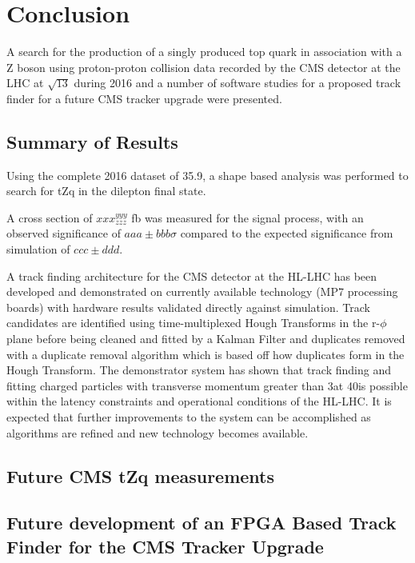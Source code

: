 \chapter{Conclusion}\label{chapter:conclusion}

A search for the production of a singly produced top quark in association with a Z boson using proton-proton collision data recorded by the CMS detector at the LHC at $\sqrt{13}$ during 2016 and a number of software studies for a proposed track finder for a future CMS tracker upgrade were presented.

\section{Summary of Results}
Using the complete 2016 dataset of 35.9\fbinv, a shape based analysis was performed to search for tZq in the dilepton final state.

A cross section of $xxx^{yyy}_{zzz}$ fb was measured for the signal process, with an observed significance of $aaa \pm bbb \sigma$ compared to the expected significance from simulation of $ccc \pm ddd$. 

A track finding architecture for the CMS detector at the HL-LHC has been developed and demonstrated on currently available technology (MP7 processing boards) with hardware results validated directly against simulation. Track candidates are identified using time-multiplexed Hough Transforms in the r-$\phi$ plane before being cleaned and fitted by a Kalman Filter and duplicates removed with a duplicate removal algorithm which is based off how duplicates form in the Hough Transform. The demonstrator system has shown that track finding and fitting charged particles with transverse momentum greater than 3\GeV at 40\MHz is possible within the latency constraints and operational conditions of the HL-LHC. It is expected that further improvements to the system can be accomplished as algorithms are refined and new technology becomes available.

\section{Future CMS tZq measurements}
\section{Future development of an FPGA Based Track Finder for the CMS Tracker Upgrade}
